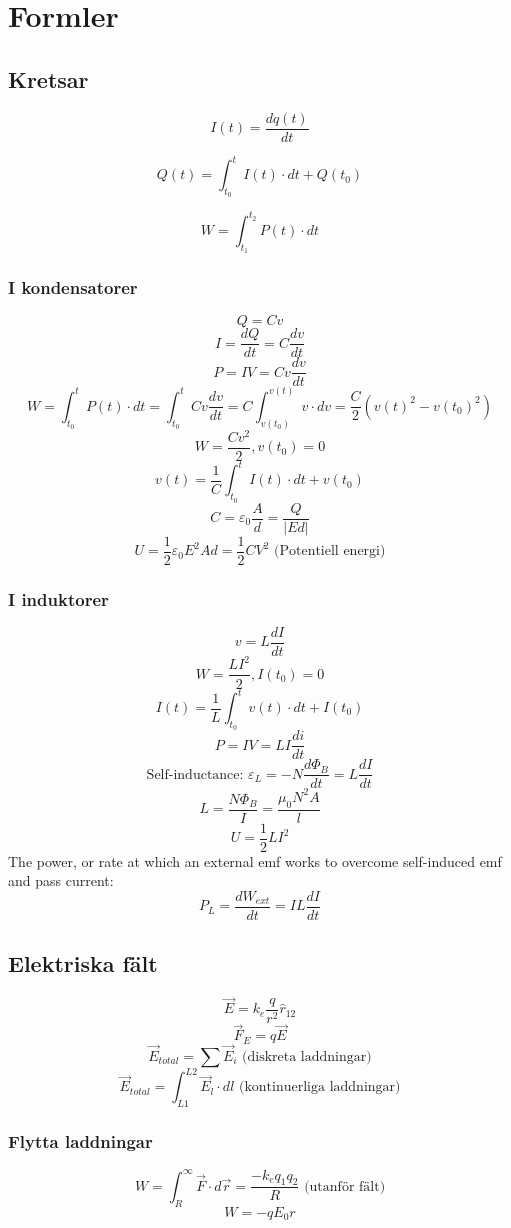 \documentclass{article}
\begin{document}
 \newpage
\section{Formler}
\subsection{Kretsar}
\[ I(t) = \frac{dq(t)}{dt} \]

\[ Q(t) = \int_{t_0}^t I(t) \cdot dt + Q(t_0) \]

\[ W = \int_{t_1}^{t_2} P(t) \cdot dt \]

\subsubsection{I kondensatorer}
\[ Q = Cv \]
\[ I = \frac{dQ}{dt} = C \frac{dv}{dt} \]
\[ P = IV = Cv \frac{dv}{dt} \]
\[ W = \int_{t_0}^t P(t) \cdot dt = \int_{t_0}^t Cv \frac{dv}{dt} = C \int_{v(t_0)}^{v(t)} v \cdot dv = \frac{C}{2}(v(t)^2 - v(t_0)^2) \]
\[ W = \frac{Cv^2}{2}, v(t_0) = 0 \]
\[ v(t) = \frac{1}{C} \int_{t_0}^t I(t)\cdot dt + v(t_0) \]
\[ C = \varepsilon_0 \frac{A}{d} = \frac{Q}{|Ed|} \]
\[ U = \frac{1}{2} \varepsilon_0 E^2Ad = \frac{1}{2} C V^2 \textrm{ (Potentiell energi)} \]

\subsubsection{I induktorer}
\[ v = L \frac{dI}{dt} \]
\[ W = \frac{LI^2}{2}, I(t_0) = 0 \]
\[ I(t) = \frac{1}{L} \int_{t_0}^t v(t) \cdot dt + I(t_0) \]
\[ P = IV = LI \frac{di}{dt} \]
\[ \textrm{Self-inductance: } \varepsilon_L = -N \frac{d\Phi_B}{dt} = L \frac{dI}{dt} \]
\[ L = \frac{N \Phi_B}{I} = \frac{\mu_0 N^2 A}{l} \]
\[ U = \frac{1}{2} LI^2 \]
The power, or rate at which an external emf works to overcome self-induced emf and pass current: \[ P_L = \frac{dW_{ext}}{dt} = IL\frac{dI}{dt} \]

\subsection{Elektriska fält}
\[ \vec{E} = k_e \frac{q}{r^2} \hat{r}_{12} \]
\[ \vec{F}_E  = q \vec{E} \]
\[ \vec{E}_{total} = \sum \vec{E}_i \textrm{ (diskreta laddningar)} \]
\[ \vec{E}_{total} = \int_{L1}^{L2} \vec{E}_l \cdot dl \textrm{ (kontinuerliga laddningar)} \]

\subsubsection{Flytta laddningar}
\[ W =\int_R^{\infty} \vec{F} \cdot d\vec{r} = \frac{-k_eq_1q_2}{R} \textrm{ (utanför fält)} \]
\[ W = -qE_0r \]
\end{document}
